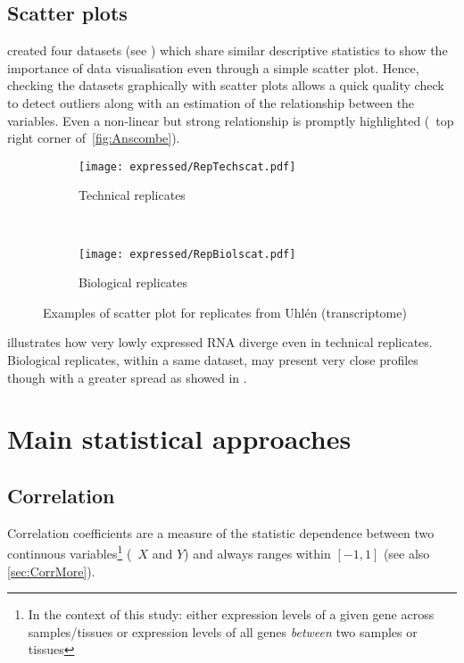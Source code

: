 \subsection{Scatter plots}

\cite{anscombe} created four datasets (see )
which share similar descriptive statistics to show the importance
of data visualisation even through a simple scatter plot.
Hence, checking the datasets graphically with scatter plots
allows a quick quality check to detect outliers along with an
estimation of the relationship between the variables.
Even a non-linear but strong relationship is promptly highlighted
(\eg\ top right corner of~\cref{fig:Anscombe}).

\begin{figure}
    \centering
    \begin{subfigure}[b]{0.45\textwidth}
        \centering \texttt{[image: expressed/RepTechscat.pdf]}
        \caption{Technical replicates}\label{fig:scatTechRep}
    \end{subfigure}~%
    \begin{subfigure}[b]{0.45\textwidth}
    \centering \texttt{[image: expressed/RepBiolscat.pdf]}
        \caption{Biological replicates}\label{fig:scatBiolRep}
    \end{subfigure}
    \caption{Examples of scatter plot for replicates from Uhlén
    (transcriptome)}\label{fig:scatEg}
\end{figure}

 illustrates how very lowly expressed \gls{RNA}
diverge even in technical replicates.
Biological replicates, within a same dataset,
may present very close profiles though with a greater spread
as showed in .


\section{Main statistical approaches}

\subsection{Correlation}

Correlation coefficients are a measure of the statistic dependence between two
continuous variables\footnote{In the context of this study: either expression
levels of a given gene across samples/tissues or expression levels of all genes
\emph{between} two samples or tissues} (\eg\
$X$ and $Y$) and always ranges within $[-1,1]$ (see also \cref{sec:CorrMore}).

